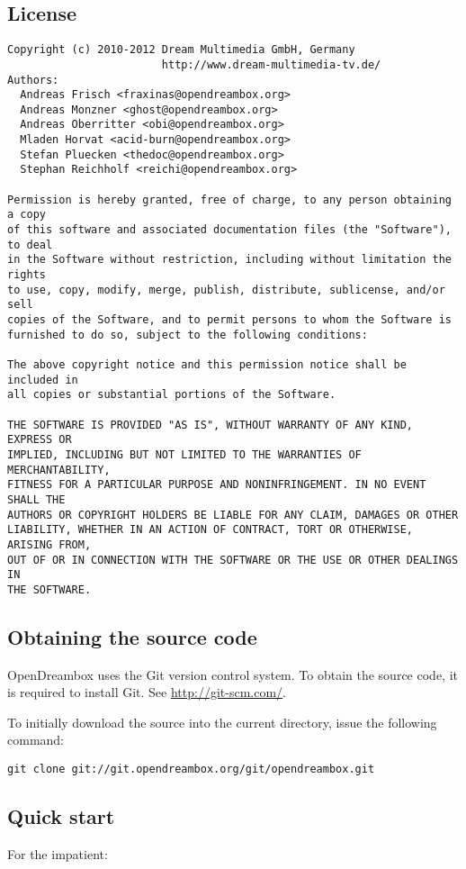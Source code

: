 \documentclass[a4paper]{article}
\newcommand{\shell}[1]{\texttt{\small #1}}
\begin{document}
  \subsection{License}

    \begin{verbatim}
Copyright (c) 2010-2012 Dream Multimedia GmbH, Germany
                        http://www.dream-multimedia-tv.de/
Authors:
  Andreas Frisch <fraxinas@opendreambox.org>
  Andreas Monzner <ghost@opendreambox.org>
  Andreas Oberritter <obi@opendreambox.org>
  Mladen Horvat <acid-burn@opendreambox.org>
  Stefan Pluecken <thedoc@opendreambox.org>
  Stephan Reichholf <reichi@opendreambox.org>

Permission is hereby granted, free of charge, to any person obtaining a copy
of this software and associated documentation files (the "Software"), to deal
in the Software without restriction, including without limitation the rights
to use, copy, modify, merge, publish, distribute, sublicense, and/or sell
copies of the Software, and to permit persons to whom the Software is
furnished to do so, subject to the following conditions:

The above copyright notice and this permission notice shall be included in
all copies or substantial portions of the Software.

THE SOFTWARE IS PROVIDED "AS IS", WITHOUT WARRANTY OF ANY KIND, EXPRESS OR
IMPLIED, INCLUDING BUT NOT LIMITED TO THE WARRANTIES OF MERCHANTABILITY,
FITNESS FOR A PARTICULAR PURPOSE AND NONINFRINGEMENT. IN NO EVENT SHALL THE
AUTHORS OR COPYRIGHT HOLDERS BE LIABLE FOR ANY CLAIM, DAMAGES OR OTHER
LIABILITY, WHETHER IN AN ACTION OF CONTRACT, TORT OR OTHERWISE, ARISING FROM,
OUT OF OR IN CONNECTION WITH THE SOFTWARE OR THE USE OR OTHER DEALINGS IN
THE SOFTWARE.
    \end{verbatim}

  \subsection{Obtaining the source code}
    OpenDreambox uses the Git version control system. To obtain the source
    code, it is required to install Git. See \url{http://git-scm.com/}.

    To initially download the source into the current directory, issue the
    following command:

    \shell{git clone git://git.opendreambox.org/git/opendreambox.git}

  \subsection{Quick start}
    For the impatient:
\end{document}
